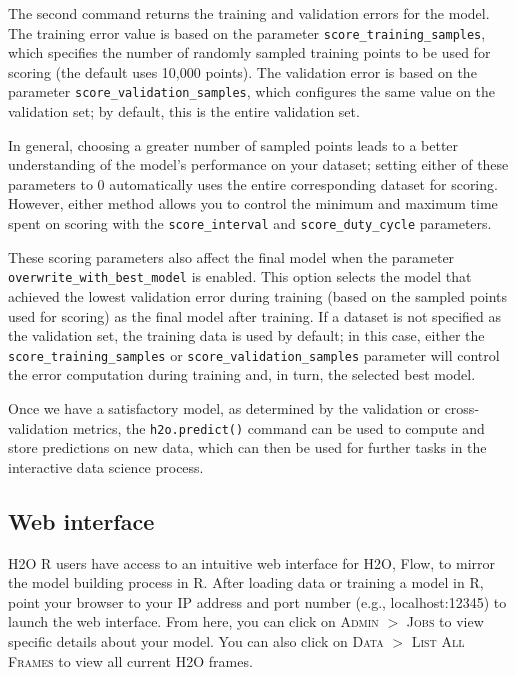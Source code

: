 \noindent
The second command returns the training and validation errors for the model. The training error value is based on the parameter \texttt{score\_training\_samples}, which specifies the number of randomly sampled training points to be used for scoring (the default uses 10,000 points). The validation error is based on the parameter \texttt{score\_validation\_samples}, which configures the same value on the validation set; by default, this is the entire validation set.

In general, choosing a greater number of sampled points leads to a better understanding of the model's performance on your dataset; setting either of these parameters to 0 automatically uses the entire corresponding dataset for scoring. However, either method allows you to control the minimum and maximum time spent on scoring with the \texttt{score\_interval} and \texttt{score\_duty\_cycle} parameters.

These scoring parameters also affect the final model when the parameter \texttt{overwrite\_with\_best\_model} is enabled. This option selects the model that achieved the lowest validation error during training (based on the sampled points used for scoring) as the final model after training. If a dataset is not specified as the validation set, the training data is used by default; in this case, either the \texttt{score\_training\_samples} or \texttt{score\_validation\_samples} parameter will control the error computation during training and, in turn, the selected best model.

Once we have a satisfactory model, as determined by the validation or cross-validation metrics, the \texttt{h2o.predict()} command can be used to compute and store predictions on new data, which can then be used for further tasks in the interactive data science process.

\waterExampleInR


\newpage
\waterExampleInPython




\subsection{Web interface} 

H2O R users have access to an intuitive web interface for H2O, Flow, to mirror the model building process in R. After loading data or training a model in R, point your browser to your IP address and port number (e.g., localhost:12345) to launch the web interface. From here, you can click on \textsc{Admin} $>$ \textsc{Jobs} to view specific details about your model. You can also click on \textsc{Data} $>$ \textsc{List All Frames} to view all current H2O frames. 

